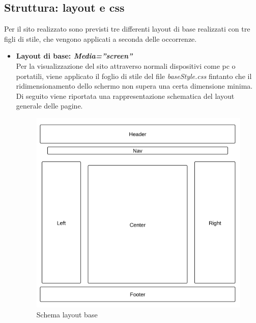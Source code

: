 \subsection{Struttura: layout e css}
\label{struttura: layout e css}
Per il sito realizzato sono previsti tre differenti layout di base realizzati con tre figli di stile, che vengono applicati a seconda delle occorrenze.

\begin{itemize}

\item \textbf{Layout di base:\textit{ Media=''screen''}}\\
Per la visualizzazione del sito attraverso normali dispositivi come pc o portatili, viene applicato il foglio di stile del file \textit{baseStyle.css} fintanto che il ridimensionamento dello schermo non supera una certa dimensione minima.\\
Di seguito viene riportata una rappresentazione schematica del layout generale delle pagine.

\begin{center}
\begin{figure}[H]
\centering
\includegraphics[scale=0.6]{images/baseLayout.png}
\caption{Schema layout base}
\end{figure}
\end{center}


\end{itemize}
